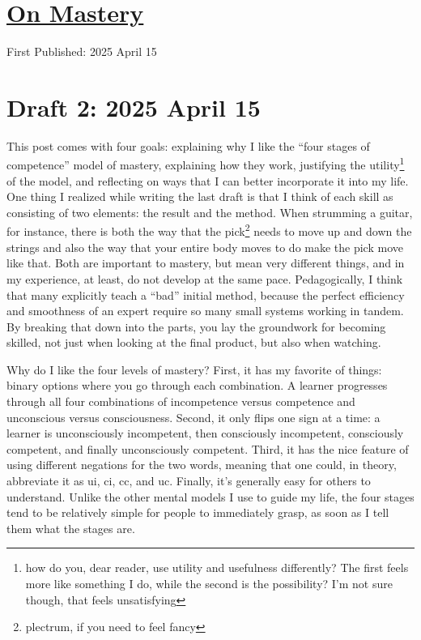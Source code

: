 \documentclass[12pt]{article}
\newcommand{\say}[1]{``#1''}
\renewcommand{\,}{\textsuperscript{,}}
\begin{document}
  
\doublespacing  
\section{\href{mastery.html}{On Mastery}}  
First Published: 2025 April 15

\section{Draft 2: 2025 April 15}

This post comes with four goals: explaining why I like the \say{four stages of competence} model of mastery, explaining how they work, justifying the utility\footnote{how do you, dear reader, use utility and usefulness differently? The first feels more like something I do, while the second is the possibility? I'm not sure though, that feels unsatisfying} of the model, and reflecting on ways that I can better incorporate it into my life.  
One thing I realized while writing the last draft is that I think of each skill as consisting of two elements: the result and the method.  
When strumming a guitar, for instance, there is both the way that the pick\footnote{plectrum, if you need to feel fancy} needs to move up and down the strings and also the way that your entire body moves to do make the pick move like that.  
Both are important to mastery, but mean very different things, and in my experience, at least, do not develop at the same pace.  
Pedagogically, I think that many explicitly teach a \say{bad} initial method, because the perfect efficiency and smoothness of an expert require so many small systems working in tandem.  
By breaking that down into the parts, you lay the groundwork for becoming skilled, not just when looking at the final product, but also when watching.

Why do I like the four levels of mastery?  
First, it has my favorite of things: binary options where you go through each combination.  
A learner progresses through all four combinations of incompetence versus competence and unconscious versus consciousness.  
Second, it only flips one sign at a time: a learner is unconsciously incompetent, then consciously incompetent, consciously competent, and finally unconsciously competent.  
Third, it has the nice feature of using different negations for the two words, meaning that one could, in theory, abbreviate it as ui, ci, cc, and uc.  
Finally, it's generally easy for others to understand.  
Unlike the other mental models I use to guide my life, the four stages tend to be relatively simple for people to immediately grasp, as soon as I tell them what the stages are.
\end{document}
